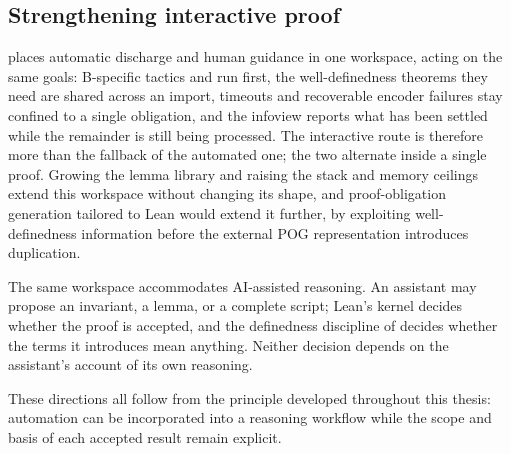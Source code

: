 \subsection{Strengthening interactive proof}

\barrel{} places automatic discharge and human guidance in one workspace, acting
on the same goals: B-specific tactics and  run first, the
well-definedness theorems they need are shared across an import, timeouts and
recoverable encoder failures stay confined to a single obligation, and the
infoview reports what has been settled while the remainder is still being
processed. The interactive route is therefore more than the fallback of the
automated one; the two alternate inside a single proof. Growing the lemma library
and raising the stack and memory ceilings extend this workspace without changing
its shape, and proof-obligation generation tailored to Lean would extend it
further, by exploiting well-definedness information before the external POG
representation introduces duplication.

The same workspace accommodates AI-assisted reasoning. An assistant may propose
an invariant, a lemma, or a complete script; Lean's kernel decides whether the
proof is accepted, and the definedness discipline of 
decides whether the terms it introduces mean anything. Neither decision depends
on the assistant's account of its own reasoning.

These directions all follow from the principle developed throughout this thesis:
automation can be incorporated into a reasoning workflow while the scope and
basis of each accepted result remain explicit.
